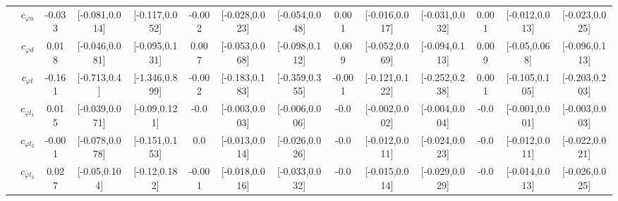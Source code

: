 \documentclass{article}
\begin{document}
\begin{table}[H]
\begin{tabular}{|c|c|c|c|c|c|c|c|c|c|c|c|c|c|}
 & $c_{\varphi u}$ & -0.033                             & [-0.081,0.014]                                 & [-0.117,0.052] & -0.002                             & [-0.028,0.023]                                 & [-0.054,0.048] & 0.001                             & [-0.016,0.017]                                 & [-0.031,0.032] & 0.001                             & [-0.012,0.013]                                 & [-0.023,0.025] \\ \cline{2-14}
 & $c_{\varphi d}$ & 0.018                             & [-0.046,0.081]                                 & [-0.095,0.131] & 0.007                             & [-0.053,0.068]                                 & [-0.098,0.112] & 0.009                             & [-0.052,0.069]                                 & [-0.094,0.113] & 0.009                             & [-0.05,0.068]                                 & [-0.096,0.113] \\ \cline{2-14}
 & $c_{\varphi t}$ & -0.161                             & [-0.713,0.4]                                 & [-1.346,0.899] & -0.002                             & [-0.183,0.183]                                 & [-0.359,0.355] & -0.001                             & [-0.121,0.122]                                 & [-0.252,0.238] & 0.001                             & [-0.105,0.105]                                 & [-0.203,0.203] \\ \cline{2-14}
 & $c_{\varphi l_1}$ & 0.015                             & [-0.039,0.071]                                 & [-0.09,0.121] & -0.0                             & [-0.003,0.003]                                 & [-0.006,0.006] & -0.0                             & [-0.002,0.002]                                 & [-0.004,0.004] & -0.0                             & [-0.001,0.001]                                 & [-0.003,0.003] \\ \cline{2-14}
 & $c_{\varphi l_2}$ & -0.001                             & [-0.078,0.078]                                 & [-0.151,0.153] & 0.0                             & [-0.013,0.014]                                 & [-0.026,0.026] & -0.0                             & [-0.012,0.011]                                 & [-0.024,0.023] & -0.0                             & [-0.012,0.011]                                 & [-0.022,0.021] \\ \cline{2-14}
 & $c_{\varphi l_3}$ & 0.027                             & [-0.05,0.104]                                 & [-0.12,0.182] & -0.001                             & [-0.018,0.016]                                 & [-0.033,0.032] & -0.0                             & [-0.015,0.014]                                 & [-0.029,0.029] & -0.0                             & [-0.014,0.013]                                 & [-0.026,0.025] \\ \cline{2-14}

\end{tabular}
\end{table}
\end{document}
